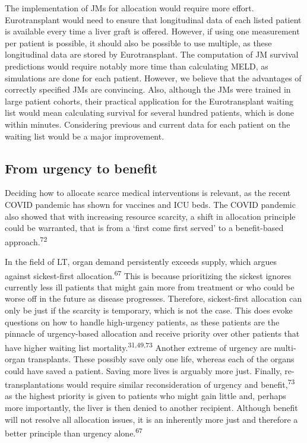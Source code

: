 \documentclass[11pt,english,]{book} %
\begin{document}
The implementation of JMs for allocation would require more effort. Eurotransplant would need to ensure that longitudinal data of each listed patient is available every time a liver graft is offered. However, if using one measurement per patient is possible, it should also be possible to use multiple, as these longitudinal data are stored by Eurotransplant. The computation of JM survival predictions would require notably more time than calculating MELD, as simulations are done for each patient. However, we believe that the advantages of correctly specified JMs are convincing. Also, although the JMs were trained in large patient cohorts, their practical application for the Eurotransplant waiting list would mean calculating survival for several hundred patients, which is done within minutes. Considering previous and current data for each patient on the waiting list would be a major improvement.

\hypertarget{from-urgency-to-benefit}{%
\subsection*{From urgency to benefit}\label{from-urgency-to-benefit}}

Deciding how to allocate scarce medical interventions is relevant, as the recent COVID pandemic has shown for vaccines and ICU beds. The COVID pandemic also showed that with increasing resource scarcity, a shift in allocation principle could be warranted, that is from a `first come first served' to a benefit-based approach.\textsuperscript{72}

In the field of LT, organ demand persistently exceeds supply, which argues against sickest-first allocation.\textsuperscript{67} This is because prioritizing the sickest ignores currently less ill patients that might gain more from treatment or who could be worse off in the future as disease progresses. Therefore, sickest-first allocation can only be just if the scarcity is temporary, which is not the case. This does evoke questions on how to handle high-urgency patients, as these patients are the pinnacle of urgency-based allocation and receive priority over other patients that have higher waiting list mortality.\textsuperscript{31,49,73} Another extreme of urgency are multi-organ transplants. These possibly save only one life, whereas each of the organs could have saved a patient. Saving more lives is arguably more just. Finally, re-transplantations would require similar reconsideration of urgency and benefit,\textsuperscript{73} as the highest priority is given to patients who might gain little and, perhaps more importantly, the liver is then denied to another recipient. Although benefit will not resolve all allocation issues, it is an inherently more just and therefore a better principle than urgency alone.\textsuperscript{67}
\end{document}
